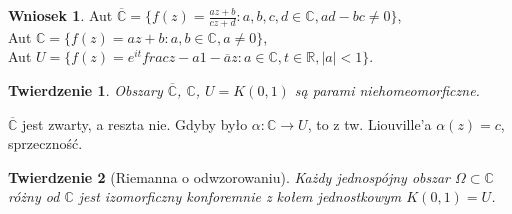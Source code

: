 \documentclass[11pt]{article}
\newcommand{\abs}[1]{\left|#1\right|} %
\newcommand{\closure}[1]{\overline{#1}} %
\newcommand{\extcomplex}{\overline{\mathbb{C}}} %
\theoremstyle{plain}
\newtheorem*{theorem}{Twierdzenie}
\theoremstyle{definition}
\newtheorem*{corollary}{Wniosek}
\theoremstyle{remark}
\let\oldendproof\endproof
\renewenvironment{proof}[1][\proofname]{
  \oldproof[\textsc{\small #1}]
}{\oldendproof}
\begin{document}
\begin{corollary}
  Aut $ \extcomplex = \{ f(z) = \frac{az+b}{cz+d}: a,b,c,d \in \mathbb{C}, ad-bc \neq 0 \}$, \\
  Aut $ \mathbb{C} = \{ f(z) = az+b: a,b \in \mathbb{C}, a \neq 0 \}$, \\
  Aut $ U = \{ f(z) = e^{it}frac{z-a}{1 - \closure{a}{z}}: a \in \mathbb{C}, t \in \mathbb{R}, \abs{a} < 1 \} $.
\end{corollary}

\begin{theorem}
  Obszary $ \extcomplex $, $ \mathbb{C}$, $ U = K(0, 1) $ są parami niehomeomorficzne.
\end{theorem}

\begin{proof}
  $ \extcomplex $ jest zwarty, a reszta nie.
  Gdyby było $ \alpha: \mathbb{C} \to U $, to z tw. Liouville'a $ \alpha(z) = c $, sprzeczność.
\end{proof}

\begin{theorem}[Riemanna o odwzorowaniu]
  Każdy jednospójny obszar $ \Omega \subset \mathbb{C} $ różny od $ \mathbb{C} $ jest izomorficzny konforemnie z kołem jednostkowym $ K(0, 1) = U $.
\end{theorem}
\end{document}
